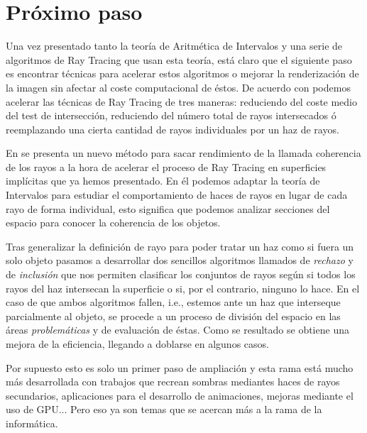 \chapter{Próximo paso}

Una vez presentado tanto la teoría de Aritmética de Intervalos y una serie de algoritmos de Ray Tracing que usan esta teoría, está claro que el siguiente paso es encontrar técnicas para acelerar estos algoritmos o mejorar la renderización de la imagen sin afectar al coste computacional de éstos. De acuerdo con \cite{Arvo87} podemos acelerar las técnicas de Ray Tracing de tres maneras: reduciendo del coste medio del test de intersección, reduciendo del número total de rayos intersecados ó reemplazando una cierta cantidad de rayos individuales por un haz de rayos.

En \cite{Florez08} se presenta un nuevo método para sacar rendimiento de la llamada coherencia de los rayos a la hora de acelerar el proceso de Ray Tracing en superficies implícitas que ya hemos presentado. En él podemos adaptar la teoría de Intervalos para estudiar el comportamiento de haces de rayos en lugar de cada rayo de forma individual, esto significa que podemos analizar secciones del espacio para conocer la coherencia de los objetos.

Tras generalizar la definición de rayo para poder tratar un haz como si fuera un solo objeto pasamos a desarrollar dos sencillos algoritmos llamados de{ \em rechazo} y de{ \em inclusión} que nos permiten clasificar los conjuntos de rayos según si todos los rayos del haz intersecan la superficie o si, por el contrario, ninguno lo hace. En el caso de que ambos algoritmos fallen, i.e., estemos ante un haz que interseque parcialmente al objeto, se procede a un proceso de división del espacio en las áreas{ \em problemáticas} y de evaluación de éstas. Como se resultado se obtiene una mejora de la eficiencia, llegando a doblarse en algunos casos.

Por supuesto esto es solo un primer paso de ampliación y esta rama está mucho más desarrollada con  trabajos que recrean sombras mediantes haces de rayos secundarios, aplicaciones para el desarrollo de animaciones, mejoras mediante el uso de GPU... Pero eso ya son temas que se acercan más a la rama de la informática.